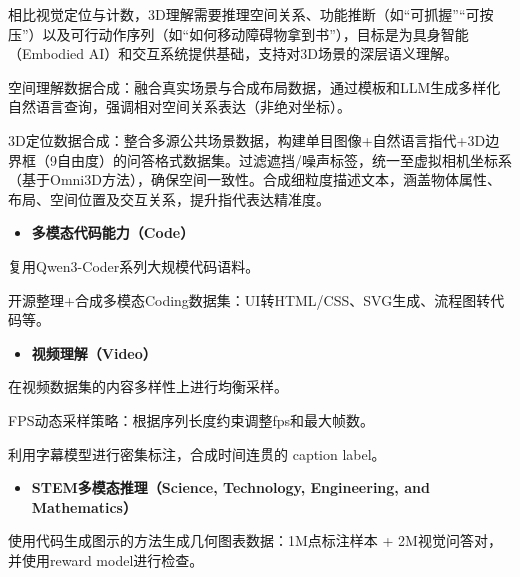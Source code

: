 \documentclass[zihao=false,fontset=windows]{ctexart}
\begin{document}
相比视觉定位与计数，3D理解需要推理空间关系、功能推断（如“可抓握”“可按压”）以及可行动作序列（如“如何移动障碍物拿到书”），目标是为具身智能（Embodied AI）和交互系统提供基础，支持对3D场景的深层语义理解。\par

空间理解数据合成：融合真实场景与合成布局数据，通过模板和LLM生成多样化自然语言查询，强调相对空间关系表达（非绝对坐标）。\par

3D定位数据合成：整合多源公共场景数据，构建单目图像+自然语言指代+3D边界框（9自由度）的问答格式数据集。过滤遮挡/噪声标签，统一至虚拟相机坐标系（基于Omni3D方法），确保空间一致性。合成细粒度描述文本，涵盖物体属性、布局、空间位置及交互关系，提升指代表达精准度。\par

\begin{itemize}[label=\textcolor{feishuBlue}{\textbullet}]
\item \textbf{多模态代码能力（Code）}

\end{itemize}

复用Qwen3-Coder系列大规模代码语料。\par

开源整理+合成多模态Coding数据集：UI转HTML/CSS、SVG生成、流程图转代码等。\par

\begin{itemize}[label=\textcolor{feishuBlue}{\textbullet}]
\item \textbf{视频理解（Video）}

\end{itemize}

在视频数据集的内容多样性上进行均衡采样。\par

FPS动态采样策略：根据序列长度约束调整fps和最大帧数。\par

利用字幕模型进行密集标注，合成时间连贯的 caption label。\par

\begin{itemize}[label=\textcolor{feishuBlue}{\textbullet}]
\item \textbf{STEM多模态推理（Science, Technology, Engineering, and Mathematics）}

\end{itemize}

使用代码生成图示的方法生成几何图表数据：1M点标注样本 + 2M视觉问答对，并使用reward model进行检查。\par
\end{document}
